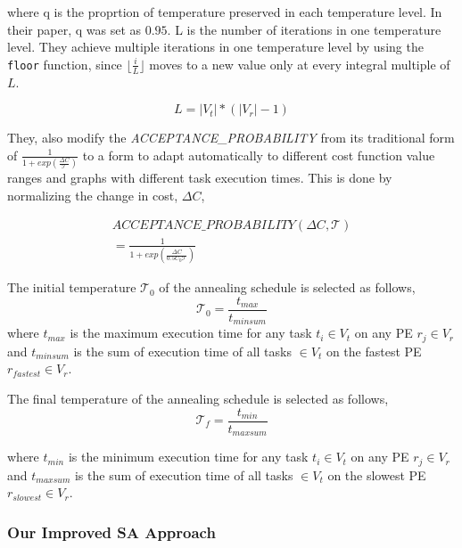 where q is the proprtion of temperature preserved in each temperature level. In
their paper, q was set as $0.95$. L is the number of iterations in one
temperature level. They achieve multiple iterations in one temperature level by
using the \texttt{floor} function, since $\lfloor \frac{i}{L} \rfloor$ moves to
a new value only at every integral multiple of $L$.

\begin{equation}
L = |V_t|*(|V_r| - 1)
\end{equation}

They, also modify the \textit{ACCEPTANCE\_PROBABILITY} from its traditional form
of $\frac{1}{1+exp(\frac{\Delta C}{\mathcal{T}})}$ to a form to adapt
automatically to different cost function value ranges and graphs with different
task execution times. This is done by normalizing the change in cost, $\Delta
C$,

\begin{equation}
  \begin{array}{c}
    ACCEPTANCE\_PROBABILITY(\Delta C, \mathcal{T}) \\ 
    = \frac{1}{1+exp(\frac{\Delta C}{0.5C_0\mathcal{T}})}
  \end{array}
\end{equation}

The initial temperature $\mathcal{T}_0$ of the annealing schedule is selected as
follows,
\begin{equation}
\mathcal{T}_0 = \frac{t_{max}}{t_{minsum}}
\end{equation}
where $t_{max}$ is the maximum execution time for any task $t_i \in V_t$ on any
PE $r_j \in V_r$ and $t_{minsum}$ is the sum of execution time of all tasks $\in
V_t$ on the fastest PE $r_{fastest} \in V_r$.

The final temperature of the annealing schedule is selected as follows,
\begin{equation}
\mathcal{T}_f = \frac{t_{min}}{t_{maxsum}}
\end{equation}

where $t_{min}$ is the minimum execution time for any task $t_i \in V_t$
on any PE $r_j \in V_r$ and $t_{maxsum}$ is the sum of execution time of
all tasks $\in V_t$ on the slowest PE $r_{slowest} \in V_r$. %

\subsubsection{Our Improved SA Approach}
\label{sec:our-improved-sa}


